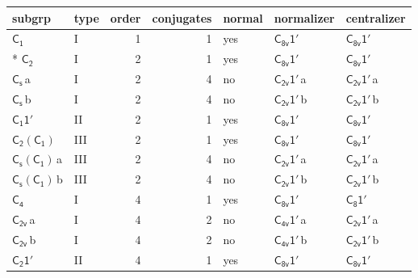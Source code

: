 \documentclass[10pt,a4paper]{article}
\numberwithin{equation}{section}
\newcommand{\grp}[1]{\mathsf{#1}}
\newcommand{\clsletter}[1]{\,{\scriptsize\color{black!55}#1}}
\begin{document}
{\small\begin{longtable}{@{}llrrlll@{}}\toprule
subgrp & type & order & conjugates & normal & normalizer & centralizer\\\midrule\endhead
\bottomrule\endfoot\endlastfoot
\href{../../../rotation/data/pdf/C1.pdf}{$\grp{C_{1}}$} & I & 1 & 1 & yes & \href{C8v-1p.pdf}{$\grp{C_{8v}1'}$} & \href{C8v-1p.pdf}{$\grp{C_{8v}1'}$}\\*
\href{../../../rotation/data/pdf/C2.pdf}{$\grp{C_{2}}$} & I & 2 & 1 & yes & \href{C8v-1p.pdf}{$\grp{C_{8v}1'}$} & \href{C8v-1p.pdf}{$\grp{C_{8v}1'}$}\\
\href{../../../rotation/data/pdf/C1v.pdf}{$\grp{C_{s}}$}\clsletter{a} & I & 2 & 4 & no & \href{C2v-1p.pdf}{$\grp{C_{2v}1'}$}\clsletter{a} & \href{C2v-1p.pdf}{$\grp{C_{2v}1'}$}\clsletter{a}\\
\href{../../../rotation/data/pdf/C1v.pdf}{$\grp{C_{s}}$}\clsletter{b} & I & 2 & 4 & no & \href{C2v-1p.pdf}{$\grp{C_{2v}1'}$}\clsletter{b} & \href{C2v-1p.pdf}{$\grp{C_{2v}1'}$}\clsletter{b}\\
\href{C1-1p.pdf}{$\grp{C_{1}1'}$} & II & 2 & 1 & yes & \href{C8v-1p.pdf}{$\grp{C_{8v}1'}$} & \href{C8v-1p.pdf}{$\grp{C_{8v}1'}$}\\
\href{C2-C1.pdf}{$\grp{C_{2}}(\grp{C_{1}})$} & III & 2 & 1 & yes & \href{C8v-1p.pdf}{$\grp{C_{8v}1'}$} & \href{C8v-1p.pdf}{$\grp{C_{8v}1'}$}\\
\href{C1v-C1.pdf}{$\grp{C_{s}}(\grp{C_{1}})$}\clsletter{a} & III & 2 & 4 & no & \href{C2v-1p.pdf}{$\grp{C_{2v}1'}$}\clsletter{a} & \href{C2v-1p.pdf}{$\grp{C_{2v}1'}$}\clsletter{a}\\
\href{C1v-C1.pdf}{$\grp{C_{s}}(\grp{C_{1}})$}\clsletter{b} & III & 2 & 4 & no & \href{C2v-1p.pdf}{$\grp{C_{2v}1'}$}\clsletter{b} & \href{C2v-1p.pdf}{$\grp{C_{2v}1'}$}\clsletter{b}\\
\href{../../../rotation/data/pdf/C4.pdf}{$\grp{C_{4}}$} & I & 4 & 1 & yes & \href{C8v-1p.pdf}{$\grp{C_{8v}1'}$} & \href{C8-1p.pdf}{$\grp{C_{8}1'}$}\\
\href{../../../rotation/data/pdf/C2v.pdf}{$\grp{C_{2v}}$}\clsletter{a} & I & 4 & 2 & no & \href{C4v-1p.pdf}{$\grp{C_{4v}1'}$}\clsletter{a} & \href{C2v-1p.pdf}{$\grp{C_{2v}1'}$}\clsletter{a}\\
\href{../../../rotation/data/pdf/C2v.pdf}{$\grp{C_{2v}}$}\clsletter{b} & I & 4 & 2 & no & \href{C4v-1p.pdf}{$\grp{C_{4v}1'}$}\clsletter{b} & \href{C2v-1p.pdf}{$\grp{C_{2v}1'}$}\clsletter{b}\\
\href{C2-1p.pdf}{$\grp{C_{2}1'}$} & II & 4 & 1 & yes & \href{C8v-1p.pdf}{$\grp{C_{8v}1'}$} & \href{C8v-1p.pdf}{$\grp{C_{8v}1'}$}\\

\end{longtable}}
\end{document}
